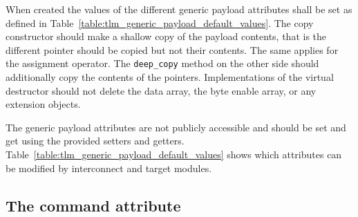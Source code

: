 {When created the values of the different generic payload attributes shall be set as defined in Table~\ref{table:tlm_generic_payload_default_values}.
The copy constructor should make a shallow copy of the payload contents, that is the different pointer should be copied but not their contents.
The same applies for the assignment operator.
The \texttt{deep\_copy} method on the other side should additionally copy the contents of the pointers. Implementations of the virtual destructor should not delete the data array, the byte enable array, or any extension objects.

The generic payload attributes are not publicly accessible and should be set and get using the provided setters and getters. 
Table~\ref{table:tlm_generic_payload_default_values} shows which attributes can be modified by interconnect and target modules.
}

\subsection{The command attribute}


